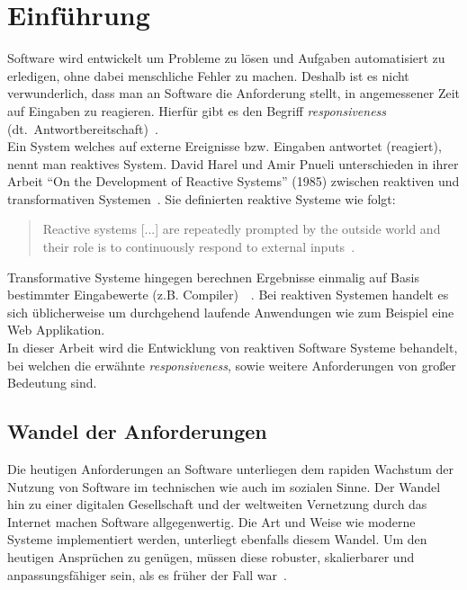 \chapter{Einführung}\label{sec:einfuehrung}
Software wird entwickelt um Probleme zu lösen und Aufgaben automatisiert zu erledigen, ohne dabei menschliche Fehler zu machen. Deshalb ist es nicht verwunderlich, dass man an Software die Anforderung stellt, in angemessener Zeit auf Eingaben zu reagieren. Hierfür gibt es den Begriff \textit{responsiveness} (dt.\ Antwortbereitschaft)~\cite[S.~18]{kuhn_reactive_2015}.\\
Ein System welches auf externe Ereignisse bzw. Eingaben antwortet (reagiert), nennt man reaktives System. David Harel und Amir Pnueli unterschieden in ihrer Arbeit \enquote{On the Development of Reactive Systems} (1985) zwischen reaktiven und transformativen Systemen~\cite{harel_development_1985}. Sie definierten reaktive Systeme wie folgt:

\begin{quotation}
  Reactive systems [...] are repeatedly prompted by the outside world and their role is to continuously respond to external inputs~\cite{harel_development_1985}.
\end{quotation}

Transformative Systeme hingegen berechnen Ergebnisse einmalig auf Basis bestimmter Eingabewerte (z.B. Compiler)~\cite[S.~2]{carkci_dataflow_2014}~\cite{wieringa_design_2003}. Bei reaktiven Systemen handelt es sich üblicherweise um durchgehend laufende Anwendungen wie zum Beispiel eine Web Applikation.\\
In dieser Arbeit wird die Entwicklung von reaktiven Software Systeme behandelt, bei welchen die erwähnte \textit{responsiveness}, sowie weitere Anforderungen von großer Bedeutung sind.

\pagebreak

\section{Wandel der Anforderungen}
Die heutigen Anforderungen an Software unterliegen dem rapiden Wachstum der Nutzung von Software im technischen wie auch im sozialen Sinne. Der Wandel hin zu einer digitalen Gesellschaft und der weltweiten Vernetzung durch das Internet machen Software allgegenwertig. Die Art und Weise wie moderne Systeme implementiert werden, unterliegt ebenfalls diesem Wandel. Um den heutigen Ansprüchen zu genügen, müssen diese robuster, skalierbarer und anpassungsfähiger sein, als es früher der Fall war~\cite{boner_reactive_2014}.\\

